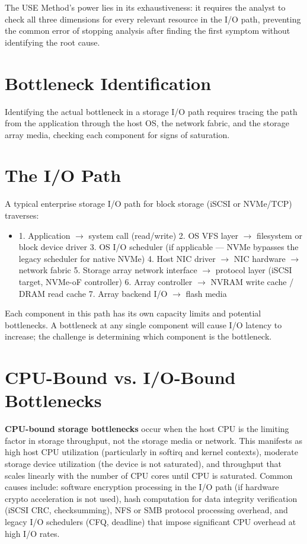 The USE Method's power lies in its exhaustiveness: it requires the analyst to check all three dimensions for every relevant resource in the I/O path, preventing the common error of stopping analysis after finding the first symptom without identifying the root cause.

\section{Bottleneck Identification}
Identifying the actual bottleneck in a storage I/O path requires tracing the path from the application through the host OS, the network fabric, and the storage array media, checking each component for signs of saturation.

\section{The I/O Path}
A typical enterprise storage I/O path for block storage (iSCSI or NVMe/TCP) traverses:

\begin{itemize}
  \item 1. Application $\rightarrow$ system call (read/write)
2. OS VFS layer $\rightarrow$ filesystem or block device driver
3. OS I/O scheduler (if applicable --- NVMe bypasses the legacy scheduler for native NVMe)
4. Host NIC driver $\rightarrow$ NIC hardware $\rightarrow$ network fabric
5. Storage array network interface $\rightarrow$ protocol layer (iSCSI target, NVMe-oF controller)
6. Array controller $\rightarrow$ NVRAM write cache / DRAM read cache
7. Array backend I/O $\rightarrow$ flash media
\end{itemize}

Each component in this path has its own capacity limits and potential bottlenecks. A bottleneck at any single component will cause I/O latency to increase; the challenge is determining which component is the bottleneck.

\section{CPU-Bound vs. I/O-Bound Bottlenecks}
\textbf{CPU-bound storage bottlenecks} occur when the host CPU is the limiting factor in storage throughput, not the storage media or network. This manifests as high host CPU utilization (particularly in softirq and kernel contexts), moderate storage device utilization (the device is not saturated), and throughput that scales linearly with the number of CPU cores until CPU is saturated. Common causes include: software encryption processing in the I/O path (if hardware crypto acceleration is not used), hash computation for data integrity verification (iSCSI CRC, checksumming), NFS or SMB protocol processing overhead, and legacy I/O schedulers (CFQ, deadline) that impose significant CPU overhead at high I/O rates.

